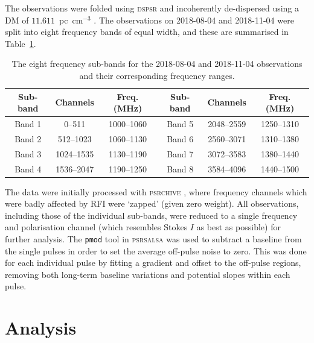 The observations were folded using \textsc{dspsr} \citep{SBxx2011} and incoherently de-dispersed using a DM of $11.611$~pc~cm$^{-3}$ \citep{NSTx1996}. The observations on 2018-08-04 and 2018-11-04 were split into eight frequency bands of equal width, and these are summarised in Table~\ref{tab: J1518 - frequency sub-bands}.
\begin{table}
    \centering
    \caption[Frequency sub-bands of the final two observations]{The eight frequency sub-bands for the 2018-08-04 and 2018-11-04 observations and their corresponding frequency ranges.}
    \label{tab: J1518 - frequency sub-bands}
    \begin{tabular}{ccc|ccc}
        \hline
        Sub-band & Channels & Freq. (MHz) & Sub-band & Channels & Freq. (MHz)\\
        \hline
        Band 1 &     0--511 & 1000--1060 & Band 5 & 2048--2559 & 1250--1310\\
        Band 2 &  512--1023 & 1060--1130 & Band 6 & 2560--3071 & 1310--1380\\
        Band 3 & 1024--1535 & 1130--1190 & Band 7 & 3072--3583 & 1380--1440\\
        Band 4 & 1536--2047 & 1190--1250 & Band 8 & 3584--4096 & 1440--1500\\
        
    \end{tabular}
\end{table}
The data were initially processed with \textsc{psrchive} \citep{HSMx2004}, where frequency channels which were badly affected by RFI were `zapped' (given zero weight). All observations, including those of the individual sub-bands, were reduced to a single frequency and polarisation channel (which resembles Stokes $I$ as best as possible) for further analysis. The \texttt{pmod} tool in \textsc{psrsalsa} \citep{Wxxx2016} was used to subtract a baseline from the single pulses in order to set the average off-pulse noise to zero. This was done for each individual pulse by fitting a gradient and offset to the off-pulse regions, removing both long-term baseline variations and potential slopes within each pulse.


\section{Analysis}
\label{sec: J1518 - analysis}

